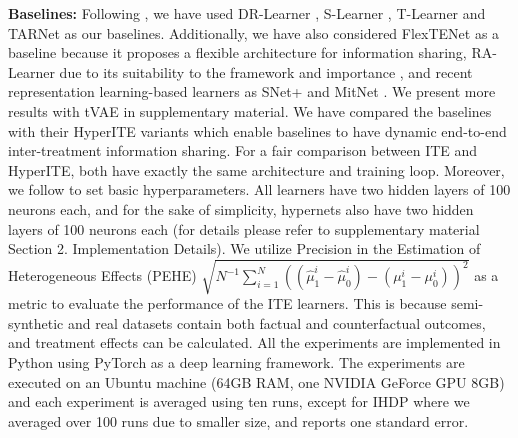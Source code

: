 \documentclass{article}
\begin{document}
\textbf{Baselines:} Following \cite{bica2022transfer}, we have used DR-Learner \cite{kennedy2022optimal}, S-Learner \cite{kunzel2019metalearners}, T-Learner \cite{kunzel2019metalearners} and TARNet \cite{johansson2016learning} as our baselines. Additionally, we have also considered FlexTENet \cite{curth2021inductive} as a baseline because it proposes a flexible architecture for information sharing, RA-Learner \cite{curth2021nonparametric} due to its suitability to the framework and importance \cite{nilforoshan2023zero}, and recent representation learning-based learners as SNet+ \cite{chauhan2023adversarial} and MitNet \cite{guo2023estimating}. We present more results with tVAE \cite{xue2023assisting} in supplementary material. We have compared the baselines with their HyperITE variants which enable baselines to have dynamic end-to-end inter-treatment information sharing. For a fair comparison between ITE and HyperITE, both have exactly the same architecture and training loop. Moreover, we follow \cite{crabbe2022benchmarking} to set basic hyperparameters. All learners have two hidden layers of 100 neurons each, and for the sake of simplicity, hypernets also have two hidden layers of 100 neurons each (for details please refer to supplementary material Section 2. Implementation Details). We utilize Precision in the Estimation of Heterogeneous Effects (PEHE) \cite{hill2011bayesian} $\sqrt{N^{-1} \sum_{i=1}^N \left(\left(\hat{\mu}_1^i - \hat{\mu}_0^i\right) - \left(\mu_1^i - \mu_0^i\right)\right)^2}$ as a metric to evaluate the performance of the ITE learners. This is because semi-synthetic and real datasets contain both factual and counterfactual outcomes, and treatment effects can be calculated.
All the experiments are implemented in Python using PyTorch as a deep learning framework. The experiments are executed on an Ubuntu machine (64GB RAM, one NVIDIA GeForce GPU 8GB) and each experiment is averaged using ten runs, except for IHDP where we averaged over 100 runs due to smaller size, and reports one standard error.
\end{document}
